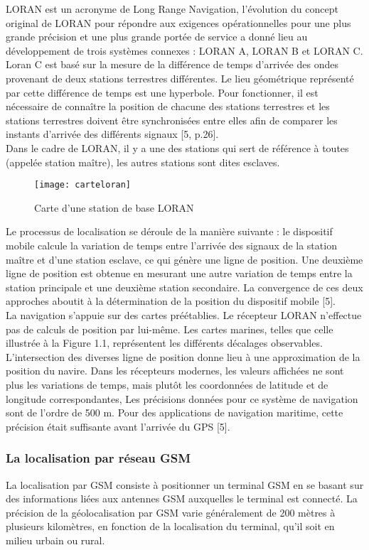LORAN est un acronyme de Long Range Navigation, l’évolution du concept original de LORAN pour répondre aux exigences opérationnelles pour une plus grande précision et une plus grande portée de service a donné lieu au développement de trois systèmes connexes : LORAN A, LORAN B et LORAN C.\\

Loran C est basé sur la mesure de la différence de temps d’arrivée des ondes provenant de deux stations terrestres différentes. Le lieu géométrique représenté par cette différence de temps est une hyperbole. Pour fonctionner, il est nécessaire de connaître la position de chacune des stations terrestres et les stations terrestres doivent être synchronisées entre elles afin de comparer les instants d’arrivée des différents signaux [5, p.26].\\

Dans le cadre de LORAN, il y a une des stations qui sert de référence à toutes  (appelée station maître), les autres stations sont dites esclaves.
\begin{figure}[H]
	\texttt{[image: carteloran]}
	\caption{Carte d’une station de base LORAN}
\end{figure}

Le processus de localisation se déroule de la manière suivante : le dispositif mobile calcule la variation de temps entre l'arrivée des signaux de la station maître et d'une station esclave, ce qui génère une ligne de position. Une deuxième ligne de position est obtenue en mesurant une autre variation de temps entre la station principale et une deuxième station secondaire. La convergence de ces deux approches aboutit à la détermination de la position du dispositif mobile [5].\\

La navigation s'appuie sur des cartes préétablies. Le récepteur LORAN n'effectue pas de calculs de position par lui-même. Les cartes marines, telles que celle illustrée à la Figure 1.1, représentent les différents décalages observables. L'intersection des diverses ligne de position donne lieu à une approximation de la position du navire. Dans les récepteurs modernes, les valeurs affichées ne sont plus les variations de temps, mais plutôt les coordonnées de latitude et de longitude correspondantes, Les précisions données pour ce système de navigation sont de l’ordre de 500 m. Pour des applications de navigation maritime, cette précision était suffisante avant l’arrivée du GPS [5].

\subsubsection{La localisation par réseau GSM}
La localisation par GSM consiste à positionner un terminal GSM en se basant sur des informations liées aux antennes GSM auxquelles le terminal est connecté. La précision de la géolocalisation par GSM varie généralement de 200 mètres à plusieurs kilomètres, en fonction de la localisation du terminal, qu'il soit en milieu urbain ou rural.\\


